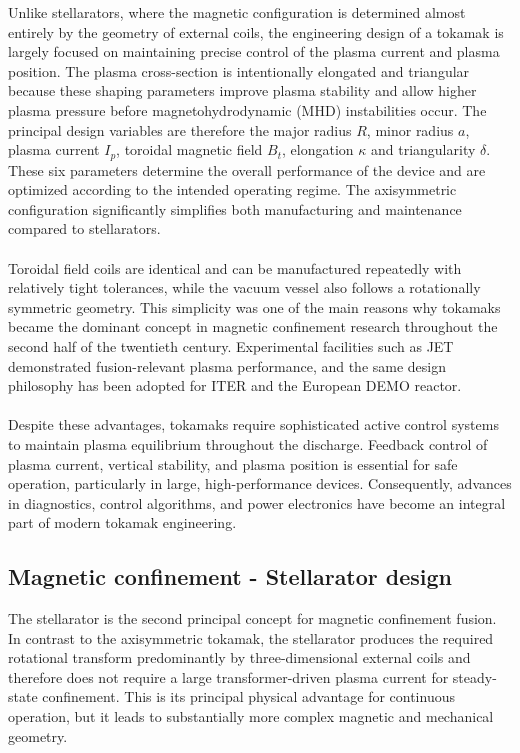 \documentclass[a4paper]{article}
\begin{document}
Unlike stellarators, where the magnetic configuration is determined almost entirely by the geometry of external coils, the engineering design of a tokamak is largely focused on maintaining precise control of the plasma current and plasma position.
The plasma cross-section is intentionally elongated and triangular because these shaping parameters improve plasma stability and allow higher plasma pressure before magnetohydrodynamic (MHD) instabilities occur.
The principal design variables are therefore the major radius $R$, minor radius $a$, plasma current $I_p$, toroidal magnetic field $B_t$, elongation $\kappa$ and triangularity $\delta$. These six parameters determine the overall performance of the device and are optimized according to the intended operating regime.
The axisymmetric configuration significantly simplifies both manufacturing and maintenance compared to stellarators.
\\
\\
Toroidal field coils are identical and can be manufactured repeatedly with relatively tight tolerances, while the vacuum vessel also follows a rotationally symmetric geometry.
This simplicity was one of the main reasons why tokamaks became the dominant concept in magnetic confinement research throughout the second half of the twentieth century.
Experimental facilities such as JET demonstrated fusion-relevant plasma performance, and the same design philosophy has been adopted for ITER and the European DEMO reactor.
\\
\\
Despite these advantages, tokamaks require sophisticated active control systems to maintain plasma equilibrium throughout the discharge.
Feedback control of plasma current, vertical stability, and plasma position is essential for safe operation, particularly in large, high-performance devices.
Consequently, advances in diagnostics, control algorithms, and power electronics have become an integral part of modern tokamak engineering.

\subsection{Magnetic confinement - Stellarator design}
The stellarator is the second principal concept for magnetic confinement fusion. In contrast to the axisymmetric tokamak, the stellarator produces the required rotational transform predominantly by three-dimensional external coils and therefore does not require a large transformer-driven plasma current for steady-state confinement. This is its principal physical advantage for continuous operation, but it leads to substantially more complex magnetic and mechanical geometry.
\end{document}
